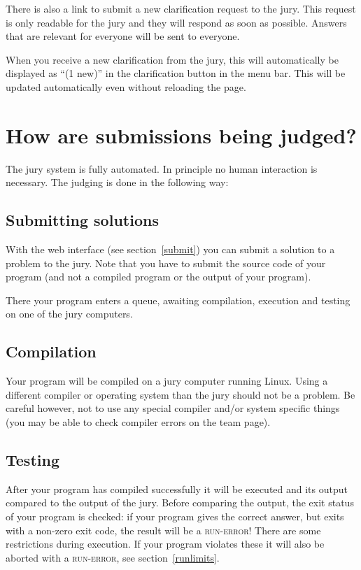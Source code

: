 There is also a link to submit a new clarification request to the
jury. This request is only readable for the jury and they will respond
as soon as possible. Answers that are relevant for everyone will be
sent to everyone.

When you receive a new clarification from the jury, this will
automatically be displayed as ``(1 new)'' in the clarification button
in the menu bar. This will be updated automatically even without reloading
the page.

\section{How are submissions being judged?}

The \DOMjudge jury system is fully automated. In principle no human
interaction is necessary. The judging is done in the following way:

\subsection{Submitting solutions}

With%
the web interface (see section~\ref{submit}) you can submit a solution
to a problem to the jury. Note that you have to submit the source code
of your program (and not a compiled program or the output of your
program).

There your program enters a queue, awaiting compilation, execution
and testing on one of the jury computers.

\subsection{Compilation}

Your program will be compiled on a jury computer running Linux.
Using a different compiler or operating system than the jury should
not be a problem. Be careful however, not to use any special compiler
and/or system specific things (you may be able to check compiler errors
on the team page).

\subsection{Testing}

After your program has compiled successfully it will be executed and
its output compared to the output of the jury. Before comparing the
output, the exit status of your program is checked: if your program
gives the correct answer, but exits with a non-zero exit code, the
result will be a \textsc{run-error}! There are some restrictions during
execution. If your program violates these it will also be aborted
with a \textsc{run-error}, see section~\ref{runlimits}.

